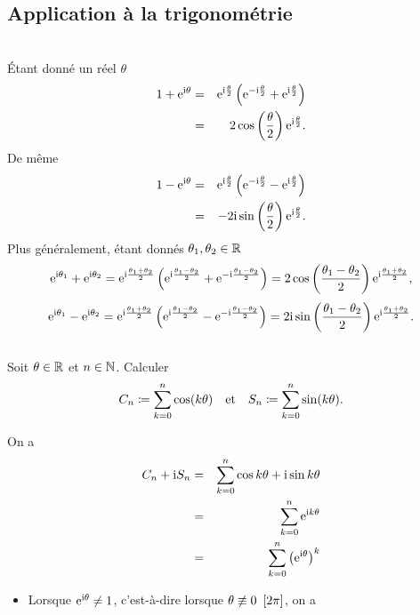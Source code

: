 \documentclass{magnoliaold}
\begin{document}
\subsection{Application à la trigonométrie}
\begin{applications}
\\
  Étant donné un réel $\theta$
  \begin{eqnarray*}
  1+{\rm e}^{{\rm i}\theta} &=& {\rm e}^{{\rm i}\frac{\theta}{2}}\left( {\rm e}^{-{\rm i}\frac{\theta}{2}}
                                            +{\rm e}^{ {\rm i}\frac{\theta}{2}}\right)\\
                &=& 2\cos\left(\frac{\theta}{2}\right){\rm e}^{{\rm i}\frac{\theta}{2}}.
  \end{eqnarray*}
  De même
  \begin{eqnarray*}
  1-{\rm e}^{{\rm i}\theta} &=& {\rm e}^{{\rm i}\frac{\theta}{2}}\left( {\rm e}^{-{\rm i}\frac{\theta}{2}}
                                            -{\rm e}^{ {\rm i}\frac{\theta}{2}}\right)\\
                &=& -2{\rm i}\sin\left(\frac{\theta}{2}\right){\rm e}^{{\rm i}\frac{\theta}{2}}.
  \end{eqnarray*}
  Plus généralement, étant donnés $\theta_1,\theta_2\in\mathbb{R}$
  \[{\rm e}^{{\rm i}\theta_1}+{\rm e}^{{\rm i}\theta_2}={\rm e}^{{\rm i}\frac{\theta_1+\theta_2}{2}}\left({\rm e}^{{\rm i}\frac{\theta_1-\theta_2}{2}}+{\rm e}^{-{\rm i}\frac{\theta_1-\theta_2}{2}}\right)=
    2\cos\left(\frac{\theta_1-\theta_2}{2}\right){\rm e}^{{\rm i}\frac{\theta_1+\theta_2}{2}},\]
   \[{\rm e}^{{\rm i}\theta_1}-{\rm e}^{{\rm i}\theta_2}={\rm e}^{{\rm i}\frac{\theta_1+\theta_2}{2}}\left({\rm e}^{{\rm i}\frac{\theta_1-\theta_2}{2}}-{\rm e}^{-{\rm i}\frac{\theta_1-\theta_2}{2}}\right)=
    2{\rm i}\sin\left(\frac{\theta_1-\theta_2}{2}\right){\rm e}^{{\rm i}\frac{\theta_1+\theta_2}{2}}.\]   
\\
  Soit $\theta\in\mathbb{R}$ et $n\in\mathbb{N}$. Calculer
   \[C_n\coloneqq\sum_{k=0}^n \cos(k\theta) \quad \text{et} \quad
    S_n\coloneqq\sum_{k=0}^n \sin(k\theta).\]
  \begin{sol}
  On a
  \begin{eqnarray*}
  C_n+{\rm i} S_n &=& \sum_{k=0}^n \cos k\theta+{\rm i}\sin k\theta\\
           &=& \sum_{k=0}^n {\rm e}^{{\rm i} k\theta}\\
           &=& \sum_{k=0}^n \left({\rm e}^{{\rm i}\theta}\right)^k
  \end{eqnarray*}
  \begin{itemize}
  \item Lorsque ${\rm e}^{{\rm i}\theta}\neq 1$, c'est-à-dire lorsque
    $\theta\not\equiv 0\ \cro{2\pi}$, on a
    \begin{eqnarray*}

\end{eqnarray*}
\end{itemize}
\end{sol}
\end{applications}
\end{document}
